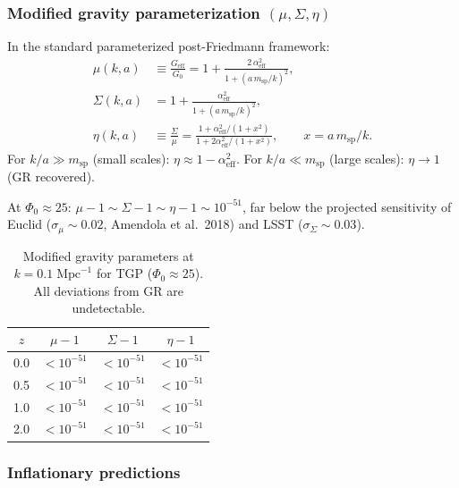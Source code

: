 \subsubsection{Modified gravity parameterization $(\mu, \Sigma, \eta)$}%
\label{sssec:mu-sigma-eta}

In the standard parameterized post-Friedmann framework:
\begin{align}
  \mu(k,a) &\equiv \frac{G_{\mathrm{eff}}}{G_0}
  = 1 + \frac{2\,\alpha_{\mathrm{eff}}^2}
        {1 + (a\,m_{\mathrm{sp}}/k)^2},
  \label{eq:mu-lss} \\[4pt]
  \Sigma(k,a) &= 1 + \frac{\alpha_{\mathrm{eff}}^2}
        {1 + (a\,m_{\mathrm{sp}}/k)^2},
  \label{eq:sigma-lss} \\[4pt]
  \eta(k,a) &\equiv \frac{\Sigma}{\mu}
  = \frac{1 + \alpha_{\mathrm{eff}}^2/(1+x^2)}
         {1 + 2\alpha_{\mathrm{eff}}^2/(1+x^2)},
  \qquad x = a\,m_{\mathrm{sp}}/k.
  \label{eq:eta-lss}
\end{align}
For $k/a \gg m_{\mathrm{sp}}$ (small scales):
$\eta \approx 1 - \alpha_{\mathrm{eff}}^2$.
For $k/a \ll m_{\mathrm{sp}}$ (large scales):
$\eta \to 1$ (GR recovered).

At $\Phi_0 \approx 25$:
$\mu - 1 \sim \Sigma - 1 \sim \eta - 1 \sim 10^{-51}$,
far below the projected sensitivity of
Euclid ($\sigma_\mu \sim 0.02$, Amendola et al.\ 2018)
and LSST ($\sigma_\Sigma \sim 0.03$).

\begin{table}[h]
\centering\small
\caption{Modified gravity parameters at
$k = 0.1\;\mathrm{Mpc}^{-1}$ for TGP ($\Phi_0 \approx 25$).
All deviations from GR are undetectable.}
\label{tab:mu-sigma-eta}
\begin{tabular}{@{}cccc@{}}
\toprule
$z$ & $\mu - 1$ & $\Sigma - 1$ & $\eta - 1$ \\
\midrule
0.0 & $< 10^{-51}$ & $< 10^{-51}$ & $< 10^{-51}$ \\
0.5 & $< 10^{-51}$ & $< 10^{-51}$ & $< 10^{-51}$ \\
1.0 & $< 10^{-51}$ & $< 10^{-51}$ & $< 10^{-51}$ \\
2.0 & $< 10^{-51}$ & $< 10^{-51}$ & $< 10^{-51}$ \\
\bottomrule
\end{tabular}
\end{table}

\subsubsection{Inflationary predictions}%
\label{sssec:inflation-lss}

